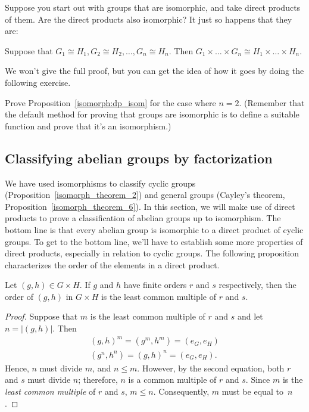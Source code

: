 Suppose you start out with groups that are isomorphic, and take direct products of them.  Are the direct products also isomorphic? It just so happens that they are:

\begin{thm}\label{isomorph:dp_isom}
Suppose that $G_1 \cong H_1, G_2 \cong H_2, \ldots, G_n \cong H_n$. Then $G_1 \times \ldots \times G_n  \cong H_1 \times \ldots \times H_n$.
\end{thm}

\noindent
We won't give the full proof, but you can get the idea of how it goes by doing the following exercise.

\begin{exercise}{}
Prove Proposition~\ref{isomorph:dp_isom} for the case where $n=2$. (Remember that the default method for proving that groups are isomorphic is to define a suitable function and prove that it's an isomorphism.)
\end{exercise}

\subsection{Classifying abelian groups by factorization}

We have used isomorphisms to classify cyclic groups (Proposition~\ref{isomorph_theorem_2}) and general groups (Cayley's theorem, Proposition~\ref{isomorph_theorem_6}). In this section, we will make use of direct products to prove a classification of abelian groups up to isomorphism. The bottom line is that every abelian group is isomorphic to a direct product of cyclic groups. To get to the bottom line, we'll have to establish some more properties of direct products, especially in relation to cyclic groups.  The following  proposition characterizes the order of the elements in a direct product.

\begin{thm}\label{isomorph:lcm_theorem}
Let $(g, h) \in G \times H$. If $g$ and $h$ have finite orders $r$ and
$s$ respectively, then the order of $(g, h)$ in $G \times H$ is the
least common multiple of $r$ and $s$. 
\end{thm}

 
\begin{proof}
Suppose that $m$ is the least common multiple of $r$ and $s$ and let
$n = |(g,h)|$. Then 
\begin{gather*}
(g,h)^m  = (g^m, h^m) = (e_G,e_H) \\
(g^n, h^n)  = (g, h)^n = (e_G,e_H).
\end{gather*}
Hence, $n$ must divide $m$, and $n \leq m$.  However, by the second
equation, both $r$ and $s$ must divide $n$; therefore, $n$ is a common
multiple of $r$ and $s$. Since $m$ is the {\em least common multiple}
of $r$ and $s$, $m \leq n$.  Consequently, $m$ must be equal to~$n$.
\end{proof}

